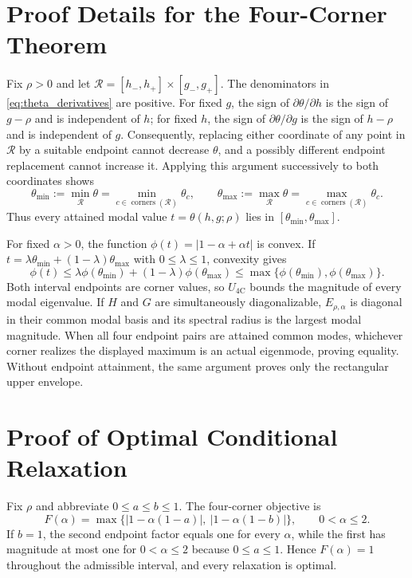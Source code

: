 \documentclass[11pt]{article}
\theoremstyle{definition}
\newcommand{\Ufour}{U_{\mathrm{4C}}}
\begin{document}
\section{Proof Details for the Four-Corner Theorem}\label{app:corner}
Fix $\rho>0$ and let
$\mathcal R=[h_-,h_+]\times[g_-,g_+]$. The denominators in
\eqref{eq:theta_derivatives} are positive. For fixed $g$, the sign of
$\partial\theta/\partial h$ is the sign of $g-\rho$ and is independent of
$h$; for fixed $h$, the sign of $\partial\theta/\partial g$ is the sign of
$h-\rho$ and is independent of $g$. Consequently, replacing either coordinate
of any point in $\mathcal R$ by a suitable endpoint cannot decrease
$\theta$, and a possibly different endpoint replacement cannot increase it.
Applying this argument successively to both coordinates shows
\[
\theta_{\min}:=\min_{\mathcal R}\theta
=\min_{c\in\operatorname{corners}(\mathcal R)}\theta_c,\qquad
\theta_{\max}:=\max_{\mathcal R}\theta
=\max_{c\in\operatorname{corners}(\mathcal R)}\theta_c.
\]
Thus every attained modal value $t=\theta(h,g;\rho)$ lies in
$[\theta_{\min},\theta_{\max}]$.

For fixed $\alpha>0$, the function
$\phi(t)=|1-\alpha+\alpha t|$ is convex. If
$t=\lambda\theta_{\min}+(1-\lambda)\theta_{\max}$ with
$0\le\lambda\le1$, convexity gives
\[
\phi(t)\le
\lambda\phi(\theta_{\min})+(1-\lambda)\phi(\theta_{\max})
\le\max\{\phi(\theta_{\min}),\phi(\theta_{\max})\}.
\]
Both interval endpoints are corner values, so $\Ufour$ bounds the magnitude
of every modal eigenvalue. If $H$ and $G$ are simultaneously diagonalizable,
$E_{\rho,\alpha}$ is diagonal in their common modal basis and its spectral
radius is the largest modal magnitude. When all four endpoint pairs are
attained common modes, whichever corner realizes the displayed maximum is an
actual eigenmode, proving equality. Without endpoint attainment, the same
argument proves only the rectangular upper envelope.

\section{Proof of Optimal Conditional Relaxation}\label{app:relaxation}
Fix $\rho$ and abbreviate $0\le a\le b\le1$. The four-corner objective is
\[
F(\alpha)=
\max\{|1-\alpha(1-a)|,\ |1-\alpha(1-b)|\},
\qquad 0<\alpha\le2.
\]
If $b=1$, the second endpoint factor equals one for every $\alpha$, while the
first has magnitude at most one for $0<\alpha\le2$ because $0\le a\le1$.
Hence $F(\alpha)=1$ throughout the admissible interval, and every relaxation
is optimal.
\end{document}
